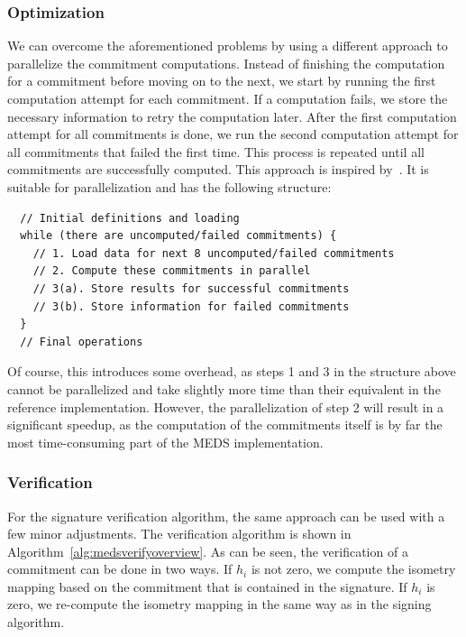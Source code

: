 \documentclass[11pt,a4paper]{report}
\theoremstyle{definition}
\begin{document}
\subsubsection{Optimization}
\label{sec:commitmentparallelizationoptimization}
We can overcome the aforementioned problems by using a different approach to parallelize the commitment computations. Instead of finishing the computation for a commitment before moving on to the next, we start by running the first computation attempt for each commitment. If a computation fails, we store the necessary information to retry the computation later. After the first computation attempt for all commitments is done, we run the second computation attempt for all commitments that failed the first time. This process is repeated until all commitments are successfully computed. This approach is inspired by~\cite{IIS2023HighLevel}. It is suitable for parallelization and has the following structure:
\begin{samepage}
  \begin{verbatim}
  // Initial definitions and loading
  while (there are uncomputed/failed commitments) {
    // 1. Load data for next 8 uncomputed/failed commitments
    // 2. Compute these commitments in parallel
    // 3(a). Store results for successful commitments
    // 3(b). Store information for failed commitments
  }
  // Final operations
\end{verbatim}
\end{samepage}
Of course, this introduces some overhead, as steps 1 and 3 in the structure above cannot be parallelized and take slightly more time than their equivalent in the reference implementation. However, the parallelization of step 2 will result in a significant speedup, as the computation of the commitments itself is by far the most time-consuming part of the MEDS implementation.

\subsubsection{Verification}
For the signature verification algorithm, the same approach can be used with a few minor adjustments. The verification algorithm is shown in Algorithm~\ref{alg:medsverifyoverview}. As can be seen, the verification of a commitment can be done in two ways. If $h_i$ is not zero, we compute the isometry mapping based on the commitment that is contained in the signature. If $h_i$ is zero, we re-compute the isometry mapping in the same way as in the signing algorithm.
\end{document}
